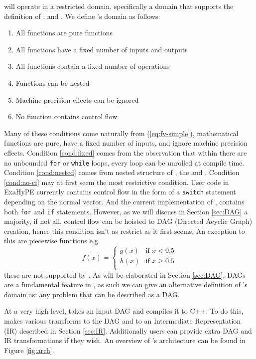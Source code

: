 \phlat will operate in a restricted domain, specifically a domain that supports the definition of ,  and .
We define \phlat{}'s domain as follows:
\begin{enumerate}
    \item All functions are pure functions
    \item All functions have a fixed number of inputs and outputs
    \item All functions contain a fixed number of operations \label{cond:fixed}
    \item Functions can be nested \label{cond:nested}
    \item Machine precision effects can be ignored
    \item No function contains control flow \label{cond:no-cf}
\end{enumerate}
Many of these conditions come naturally from (\ref{eq:fv-simple}), mathematical functions are pure, have a fixed number of inputs, and ignore machine precision effects.
Condition \ref{cond:fixed} comes from the observation that within  there are no unbounded \lstinline{for} or \lstinline{while} loops, every loop can be unrolled at compile time.
Condition \ref{cond:nested} comes from nested structure of , the  and .
Condition \ref{cond:no-cf} may at first seem the most restrictive condition.
User code in ExaHyPE currently contains control flow in the form of a \lstinline{switch} statement depending on the normal vector.
And the current implementation of , contains both \lstinline{for} and \lstinline{if} statements.
However, as we will discuss in Section \ref{sec:DAG} a majority, if not all, control flow can be hoisted to DAG (Directed Acyclic Graph) creation, hence this condition isn't as restrict as it first seems.
An exception to this are piecewise functions e.g.
\[
    f(x) = \begin{cases} g(x)  & \text{if } x<0.5 \\  h(x)  & \text{if } x\geq 0.5 \\\end{cases}
\]
these are not supported by \phlat.
As will be elaborated in Section \ref{sec:DAG}, DAGs are a fundamental feature in \phlat, as such we can give an alternative definition of \phlat{}'s domain as: any problem that can be described as a DAG.

At a very high level, \phlat takes an input DAG and compiles it to C++.
To do this, \phlat makes various transforms to the DAG and to an Intermediate Representation (IR) described in Section \ref{sec:IR}.
Additionally users can provide extra DAG and IR transformations if they wish.
An overview of \phlat{}'s architecture can be found in Figure \ref{fig:arch}.

